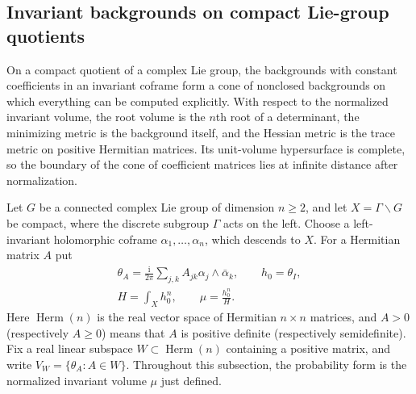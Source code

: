 \subsection{Invariant backgrounds on compact Lie-group quotients}
\label{sec:parallelizable-gauduchon-cones}

On a compact quotient of a complex Lie group, the backgrounds with constant coefficients in an invariant coframe form a cone of nonclosed backgrounds on which everything can be computed explicitly. With respect to the normalized invariant volume, the root volume is the $n$th root of a determinant, the minimizing metric is the background itself, and the Hessian metric is the trace metric on positive Hermitian matrices. Its unit-volume hypersurface is complete, so the boundary of the cone of coefficient matrices lies at infinite distance after normalization.

Let $G$ be a connected complex Lie group of dimension $n\geq2$, and let $X=\Gamma\backslash G$ be compact, where the discrete subgroup $\Gamma$ acts on the left. Choose a left-invariant holomorphic coframe $\alpha_1,\ldots,\alpha_n$, which descends to $X$. For a Hermitian matrix $A$ put
\[
 \begin{gathered}
 \theta_A=\frac{\mathrm i}{2\pi}\sum_{j,k}A_{jk}\alpha_j\wedge\bar\alpha_k,
 \qquad h_0=\theta_I,\\
 H=\int_Xh_0^n,\qquad \mu=\frac{h_0^n}{H}.
 \end{gathered}
\]
Here $\operatorname{Herm}(n)$ is the real vector space of Hermitian $n\times n$ matrices, and $A>0$ (respectively $A\geq0$) means that $A$ is positive definite (respectively semidefinite). Fix a real linear subspace $W\subset\operatorname{Herm}(n)$ containing a positive matrix, and write $V_W=\{\theta_A:A\in W\}$. Throughout this subsection, the probability form is the normalized invariant volume $\mu$ just defined.

